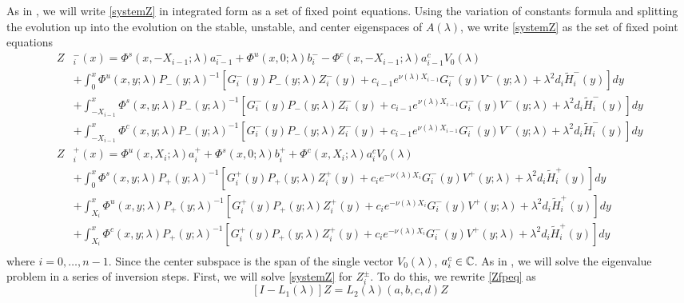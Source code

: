 \documentclass[thesis.tex]{subfiles}
\begin{document}
As in \cite{Sandstede1998}, we will write \eqref{systemZ} in integrated form as a set of fixed point equations. Using the variation of constants formula and splitting the evolution up into the evolution on the stable, unstable, and center eigenspaces of $A(\lambda)$, we write \eqref{systemZ} as the set of fixed point equations
\begin{equation}\label{Zfpeq}
\begin{aligned}
Z&_i^-(x) = \Phi^s(x, -X_{i-1}; \lambda) a_{i-1}^- + \Phi^u(x, 0; \lambda) b_i^- - \Phi^c(x, -X_{i-1}; \lambda) a_{i-1}^c V_0(\lambda) \\
&+ \int_0^x \Phi^u(x, y; \lambda)P_-(y; \lambda)^{-1} [ G_i^-(y) P_-(y; \lambda)Z_i^-(y) + c_{i-1} e^{\nu(\lambda)X_{i-1}} G_i^-(y) V^-(y; \lambda) + \lambda^2 d_i \tilde{H}_i^-(y)] dy \\
&+ \int_{-X_{i-1}}^x \Phi^s(x, y; \lambda) P_-(y; \lambda)^{-1}[ G_i^-(y) P_-(y; \lambda)Z_i^-(y) + c_{i-1} e^{\nu(\lambda)X_{i-1}} G_i^-(y) V^-(y; \lambda) + \lambda^2 d_i \tilde{H}_i^-(y)] dy \\
&+ \int_{-X_{i-1}}^x \Phi^c(x, y; \lambda) P_-(y; \lambda)^{-1}[ G_i^-(y) P_-(y; \lambda)Z_i^-(y) + c_{i-1} e^{\nu(\lambda)X_{i-1}} G_i^-(y) V^-(y; \lambda) + \lambda^2 d_i \tilde{H}_i^-(y)] dy  \\ 
Z&_i^+(x) = \Phi^u(x, X_i; \lambda) a_i^+ + \Phi^s(x, 0; \lambda) b_i^+ + \Phi^c(x, X_i; \lambda) a_i^c V_0(\lambda) \\
&+ \int_0^x \Phi^s(x, y; \lambda) P_+(y; \lambda)^{-1} [ G_i^+(y) P_+(y; \lambda) Z_i^+(y) + c_i e^{-\nu(\lambda)X_i} G_i^-(y)V^+(y; \lambda) + \lambda^2 d_i \tilde{H}_i^+(y)] dy \\
&+ \int_{X_i}^x \Phi^u(x, y; \lambda) P_+(y; \lambda)^{-1} [ G_i^+(y) P_+(y; \lambda) Z_i^+(y) + c_i e^{-\nu(\lambda)X_i} G_i^-(y)V^+(y; \lambda) + \lambda^2 d_i \tilde{H}_i^+(y)] dy \\
&+ \int_{X_i}^x \Phi^c(x, y; \lambda) P_+(y; \lambda)^{-1} [ G_i^+(y) P_+(y; \lambda) Z_i^+(y) + c_i e^{-\nu(\lambda)X_i} G_i^-(y)V^+(y; \lambda) + \lambda^2 d_i \tilde{H}_i^+(y)] dy \\
\end{aligned}
\end{equation}
where $i = 0, \dots, n-1$. Since the center subspace is the span of the single vector $V_0(\lambda)$, $a_i^c \in \mathbb{C}$. As in \cite{Sandstede1998}, we will solve the eigenvalue problem in a series of inversion steps. First, we will solve \cref{systemZ} for $Z_i^\pm$. To do this, we rewrite \eqref{Zfpeq} as
\begin{equation}\label{L1L2eq}
[I - L_1(\lambda)]Z = L_2(\lambda)(a,b,c,d)Z
\end{equation}
\end{document}
